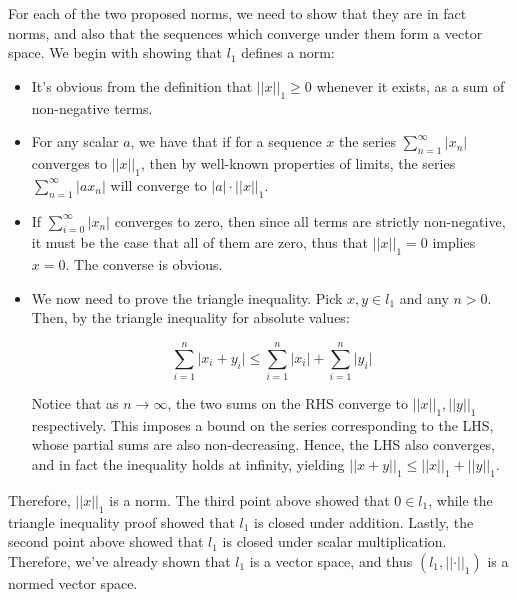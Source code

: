 \begin{solution}
    
    For each of the two proposed norms, we need to show that they are in fact norms, and also that the sequences which converge under them form a vector space.
    We begin with showing that $l_1$ defines a norm:
    \begin{itemize}
        \item It's obvious from the definition that $\lvert \lvert x \rvert \rvert_1 \geq 0$ whenever it exists, as a sum of non-negative terms.
        \item For any scalar $a$, we have that if for a sequence $x$ the series $\sum_{n=1}^{\infty} \lvert x_n \rvert$ converges to $\lvert \lvert x \rvert \rvert _1$, then by well-known properties of limits, the series $\sum_{n=1}^{\infty} \lvert a x_n \rvert$ will converge to $\lvert a \rvert \cdot \lvert \lvert x \rvert \rvert _1$.
        \item If $\sum_{i=0}^{\infty} \lvert x_n \rvert$ converges to zero, then since all terms are strictly non-negative, it must be the case that all of them are zero, thus that $\lvert \lvert x \rvert \rvert _1 = 0$ implies $x = 0$.
        The converse is obvious.
        \item We now need to prove the triangle inequality.
        Pick $x, y \in l_1$ and any $n > 0$.
        Then, by the triangle inequality for absolute values:

        $$ \sum_{i=1}^{n} \lvert x_i + y_i \rvert \leq \sum_{i=1}^{n} \lvert x_i \rvert + \sum_{i=1}^{n} \lvert y_i \rvert$$

        Notice that as $n \rightarrow \infty$, the two sums on the RHS converge to $\lvert \lvert x \rvert \rvert _1, \lvert \lvert y \rvert \rvert _1$ respectively.
        This imposes a bound on the series corresponding to the LHS, whose partial sums are also non-decreasing.
        Hence, the LHS also converges, and in fact the inequality holds at infinity, yielding $\lvert \lvert x + y \rvert \rvert _1 \leq \lvert \lvert x \rvert \rvert _1 + \lvert \lvert y \rvert \rvert _1$.
    \end{itemize}
    Therefore, $\lvert \lvert x \rvert \rvert_1$ is a norm.
    The third point above showed that $0 \in l_1$, while the triangle inequality proof showed that $l_1$ is closed under addition.
    Lastly, the second point above showed that $l_1$ is closed under scalar multiplication.
    Therefore, we've already shown that $l_1$ is a vector space, and thus $(l_1, \lvert \lvert \cdot \rvert \rvert_1)$ is a normed vector space.


\end{solution}
